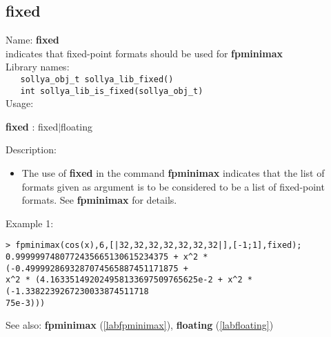 \subsection{fixed}
\label{labfixed}
\noindent Name: \textbf{fixed}\\
\phantom{aaa}indicates that fixed-point formats should be used for \textbf{fpminimax}\\[0.2cm]
\noindent Library names:\\
\verb|   sollya_obj_t sollya_lib_fixed()|\\
\verb|   int sollya_lib_is_fixed(sollya_obj_t)|\\[0.2cm]
\noindent Usage: 
\begin{center}
\textbf{fixed} : \textsf{fixed$|$floating}\\
\end{center}
\noindent Description: \begin{itemize}

\item The use of \textbf{fixed} in the command \textbf{fpminimax} indicates that the list of
   formats given as argument is to be considered to be a list of fixed-point
   formats.
   See \textbf{fpminimax} for details.
\end{itemize}
\noindent Example 1: 
\begin{center}\begin{minipage}{15cm}\begin{Verbatim}[frame=single,commandchars=\\\|\~]
> fpminimax(cos(x),6,[|32,32,32,32,32,32,32|],[-1;1],fixed);
0.9999997480772435665130615234375 + x^2 * (-0.4999928693287074565887451171875 + 
x^2 * (4.163351492024958133697509765625e-2 + x^2 * (-1.3382239267230033874511718
75e-3)))
\end{Verbatim}
\end{minipage}\end{center}
See also: \textbf{fpminimax} (\ref{labfpminimax}), \textbf{floating} (\ref{labfloating})
